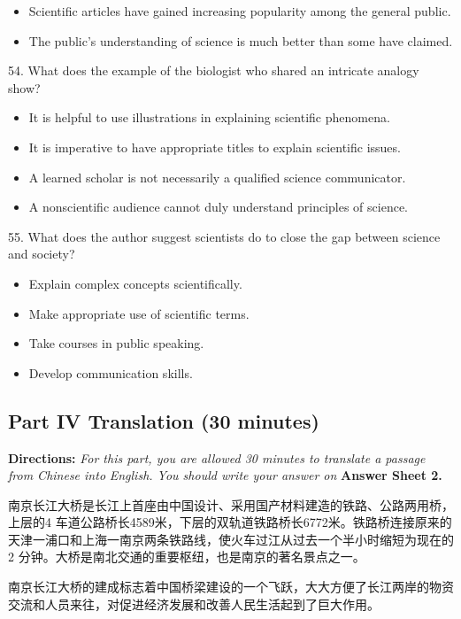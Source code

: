 \documentclass[UTF8,11pt]{ctexart}
\begin{document}
\begin{itemize}[leftmargin=2em,itemsep=.2em,topsep=.4em]\item[C.] Scientific articles have gained increasing popularity among the general public.
\item[D.] The public's understanding of science is much better than some have claimed.
\end{itemize}

54. What does the example of the biologist who shared an intricate analogy show?


\begin{itemize}[leftmargin=2em,itemsep=.2em,topsep=.4em]\item[A.] It is helpful to use illustrations in explaining scientific phenomena.
\item[B.] It is imperative to have appropriate titles to explain scientific issues.
\item[C.] A learned scholar is not necessarily a qualified science communicator.
\item[D.] A nonscientific audience cannot duly understand principles of science.
\end{itemize}

55. What does the author suggest scientists do to close the gap between science and society?


\begin{itemize}[leftmargin=2em,itemsep=.2em,topsep=.4em]\item[A.] Explain complex concepts scientifically.
\item[B.] Make appropriate use of scientific terms.
\item[C.] Take courses in public speaking.
\item[D.] Develop communication skills.
\end{itemize}

\subsection*{\textbf{Part IV} \textbf{Translation} \textbf{(30 minutes)}}


\textbf{Directions: }\textit{For this part, you are allowed 30 minutes to translate a passage from Chinese into} \textit{English. You should write your answer on}\textbf{ Answer Sheet 2.}


南京长江大桥是长江上首座由中国设计、采用国产材料建造的铁路、公路两用桥，上层的4 车道公路桥长4589米，下层的双轨道铁路桥长6772米。铁路桥连接原来的天津一浦口和上海一南京两条铁路线，使火车过江从过去一个半小时缩短为现在的2 分钟。大桥是南北交通的重要枢纽，也是南京的著名景点之一。


南京长江大桥的建成标志着中国桥梁建设的一个飞跃，大大方便了长江两岸的物资交流和人员来往，对促进经济发展和改善人民生活起到了巨大作用。
\end{document}
